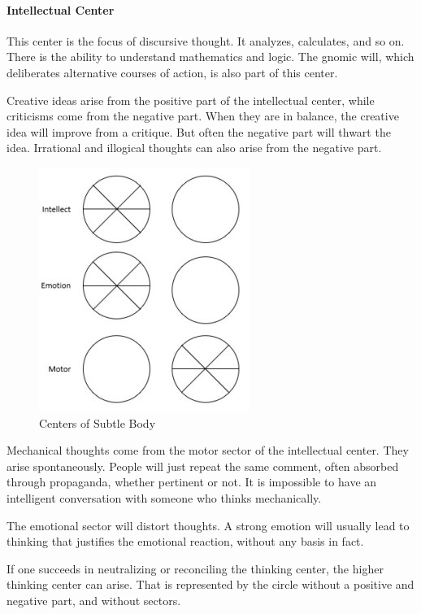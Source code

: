 \paragraph{Intellectual Center}
This center is the focus of discursive thought. It analyzes, calculates, and so on. There is the ability to understand mathematics and logic. The gnomic will, which deliberates alternative courses of action, is also part of this center.

Creative ideas arise from the positive part of the intellectual center, while criticisms come from the negative part. When they are in balance, the creative idea will improve from a critique. But often the negative part will thwart the idea. Irrational and illogical thoughts can also arise from the negative part.

\begin{figure}
 \includegraphics[scale=.5]{a20221113SacredScience108TheSubtleState-img002.jpg} 
 \caption{Centers of Subtle Body}
\end{figure}

Mechanical thoughts come from the motor sector of the intellectual center. They arise spontaneously. People will just repeat the same comment, often absorbed through propaganda, whether pertinent or not. It is impossible to have an intelligent conversation with someone who thinks mechanically.

The emotional sector will distort thoughts. A strong emotion will usually lead to thinking that justifies the emotional reaction, without any basis in fact.

If one succeeds in neutralizing or reconciling the thinking center, the higher thinking center can arise. That is represented by the circle without a positive and negative part, and without sectors.

